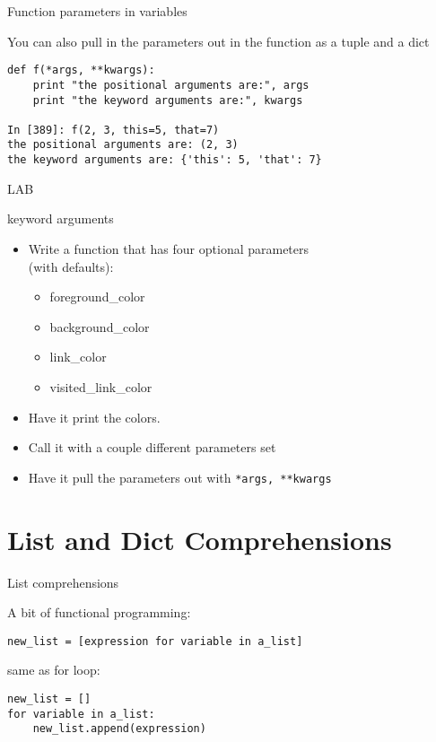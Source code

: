 \documentclass{beamer}
\begin{document}
\begin{frame}[fragile]{Function parameters in variables}

{\Large You can also pull in the parameters out in the function as a tuple and a dict
}
\begin{verbatim}
def f(*args, **kwargs):
    print "the positional arguments are:", args
    print "the keyword arguments are:", kwargs
 
In [389]: f(2, 3, this=5, that=7)
the positional arguments are: (2, 3)
the keyword arguments are: {'this': 5, 'that': 7}
\end{verbatim}

\end{frame} 

\begin{frame}[fragile]{LAB}

{\Large keyword arguments}
\begin{itemize}
  \item Write a function that has four optional parameters\\
        (with defaults):
  \begin{itemize}
      \item foreground\_color
      \item background\_color
      \item link\_color
      \item visited\_link\_color
  \end{itemize}
  \item Have it print the colors.
  \item Call it with a couple different parameters set
  \item Have it pull the parameters out with \verb|*args, **kwargs| 
\end{itemize}

\end{frame}

\section{List and Dict Comprehensions}

\begin{frame}[fragile]{List comprehensions}

{\Large A bit of functional programming:}

\begin{verbatim}
new_list = [expression for variable in a_list]
\end{verbatim}

{\Large same as for loop:}

\begin{verbatim}
new_list = []
for variable in a_list:
    new_list.append(expression)
\end{verbatim}

\end{frame} 
\end{document}
